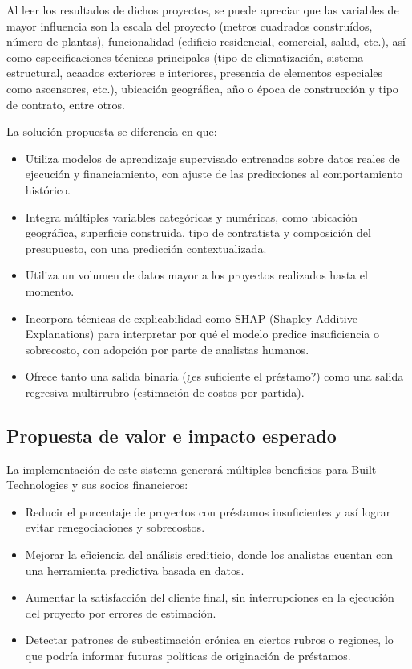 \documentclass[
11pt, %
]{charter}
\begin{document}
Al leer los resultados de dichos proyectos, se puede apreciar que las variables de mayor influencia son la escala del proyecto (metros cuadrados construídos, número de plantas), funcionalidad (edificio residencial, comercial, salud, etc.), así como especificaciones técnicas principales (tipo de climatización, sistema estructural, acaados exteriores e interiores, presencia de elementos especiales como ascensores, etc.), ubicación geográfica, año o época de construcción y tipo de contrato, entre otros.


La solución propuesta se diferencia en que:
\begin{itemize}
    \item Utiliza modelos de aprendizaje supervisado entrenados sobre datos reales de ejecución y financiamiento, con ajuste de las predicciones al comportamiento histórico.
    \item Integra múltiples variables categóricas y numéricas, como ubicación geográfica, superficie construida, tipo de contratista y composición del presupuesto, con una predicción contextualizada.
    \item Utiliza un volumen de datos mayor a los proyectos realizados hasta el momento.
    \item Incorpora técnicas de explicabilidad como SHAP (Shapley Additive Explanations) para interpretar por qué el modelo predice insuficiencia o sobrecosto, con adopción por parte de analistas humanos.
    \item Ofrece tanto una salida binaria (¿es suficiente el préstamo?) como una salida regresiva multirrubro (estimación de costos por partida).
\end{itemize}

\subsection*{Propuesta de valor e impacto esperado}

La implementación de este sistema generará múltiples beneficios para Built Technologies y sus socios financieros:

\begin{itemize}
    \item Reducir el porcentaje de proyectos con préstamos insuficientes y así lograr evitar renegociaciones y sobrecostos.
    \item Mejorar la eficiencia del análisis crediticio, donde los analistas cuentan con una herramienta predictiva basada en datos.
    \item Aumentar la satisfacción del cliente final, sin interrupciones en la ejecución del proyecto por errores de estimación.
    \item Detectar patrones de subestimación crónica en ciertos rubros o regiones, lo que podría informar futuras políticas de originación de préstamos.
\end{itemize}
\end{document}
